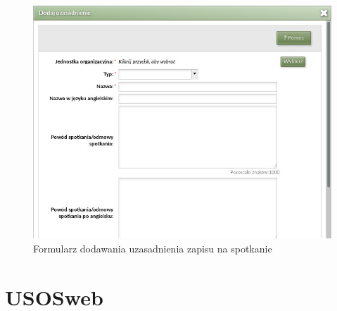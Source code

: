 \documentclass[licencjacka]{pracamgr}
\begin{document}
\begin{figure}[!]
  \includegraphics[width=\linewidth]{formularz_uzasadnien.jpg}
  \caption{Formularz dodawania uzasadnienia zapisu na spotkanie}
  \label{fig:formularz_uzasadnienia}
\end{figure}


\section{USOSweb} \label{sec:impusosweb}
\end{document}
